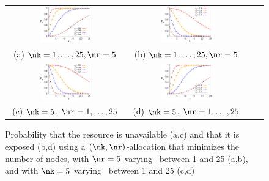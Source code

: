 {\begin{figure}[t]
	\centering
	\hspace*{-25pt}
	\setlength{\tabcolsep}{20pt}
	\begin{tabular}{cccc}
		\includegraphics[width=0.45\textwidth]{figures/bdfprs-fig07a} & 
		\includegraphics[width=0.45\textwidth]{figures/bdfprs-fig07b} \\[3pt]
		\footnotesize{\hspace{20pt}(a) $\nk=1$,$\ldots,25, \nr=5$} &
		\footnotesize{\hspace{20pt}(b) $\nk=1$,$\ldots,25, \nr=5$} \\[20pt]  
		\includegraphics[width=0.45\textwidth]{figures/bdfprs-fig07c} &
		\includegraphics[width=0.45\textwidth]{figures/bdfprs-fig07d} \\[3pt]
		\footnotesize{\hspace{20pt}(c)  $\nk=5$, $\nr=1,\ldots,25$} &
		\footnotesize{\hspace{20pt}(d) $\nk=5$, $\nr=1,\ldots,25$} \\[20pt]
	\end{tabular}
	\caption{\label{dcs:fig:kompact} Probability that the resource is
		unavailable (a,c) and that it is exposed (b,d) using a
		$(\nk,\nr)$-allocation that minimizes the number of nodes, with
		$\nr=5$ varying \nk\ between 1 and 25 (a,b), and with $\nk=5$
		varying \nr\ between 1 and 25 (c,d)}
\end{figure}

}

